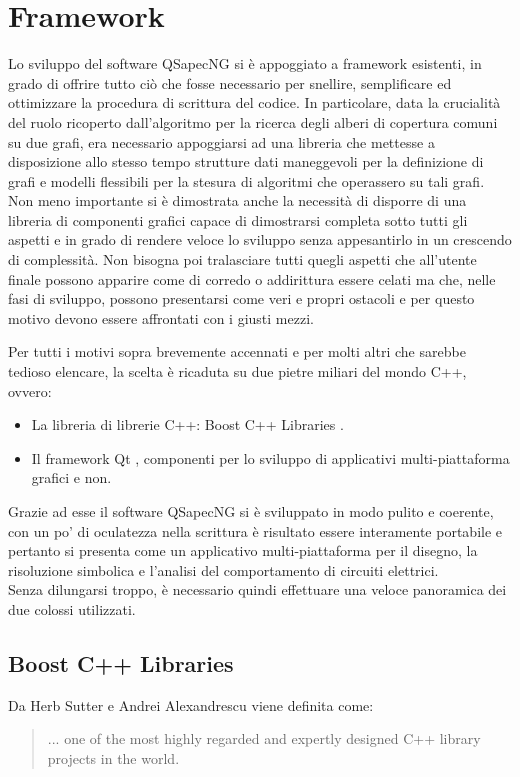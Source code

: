 \chapter{Framework}

Lo sviluppo del software QSapecNG si è appoggiato a framework esistenti, in grado di offrire tutto ciò che fosse necessario per snellire, semplificare ed ottimizzare la procedura di scrittura del codice. In particolare, data la crucialità del ruolo ricoperto dall'algoritmo per la ricerca degli alberi di copertura comuni su due grafi, era necessario appoggiarsi ad una libreria che mettesse a disposizione allo stesso tempo strutture dati maneggevoli per la definizione di grafi e modelli flessibili per la stesura di algoritmi che operassero su tali grafi. Non meno importante si è dimostrata anche la necessità di disporre di una libreria di componenti grafici capace di dimostrarsi completa sotto tutti gli aspetti e in grado di rendere veloce lo sviluppo senza appesantirlo in un crescendo di complessità. Non bisogna poi tralasciare tutti quegli aspetti che all'utente finale possono apparire come di corredo o addirittura essere celati ma che, nelle fasi di sviluppo, possono presentarsi come veri e propri ostacoli e per questo motivo devono essere affrontati con i giusti mezzi.

Per tutti i motivi sopra brevemente accennati e per molti altri che sarebbe tedioso elencare, la scelta è ricaduta su due pietre miliari del mondo C++, ovvero:
\begin{itemize}
 \item La libreria di librerie C++: Boost C++ Libraries \cite{Boost}.
 \item Il framework Qt \cite{Qt}, componenti per lo sviluppo di applicativi multi-piattaforma grafici e non.
\end{itemize}
Grazie ad esse il software QSapecNG si è sviluppato in modo pulito e coerente, con un po' di oculatezza nella scrittura è risultato essere interamente portabile e pertanto si presenta come un applicativo multi-piattaforma per il disegno, la risoluzione simbolica e l'analisi del comportamento di circuiti elettrici.\\
Senza dilungarsi troppo, è necessario quindi effettuare una veloce panoramica dei due colossi utilizzati.


\section{Boost C++ Libraries}
Da Herb Sutter e Andrei Alexandrescu viene definita \cite{CppCodStd} come:
\begin{quote}
 ... one of the most highly regarded and expertly designed C++ library projects in the world.
\end{quote}

